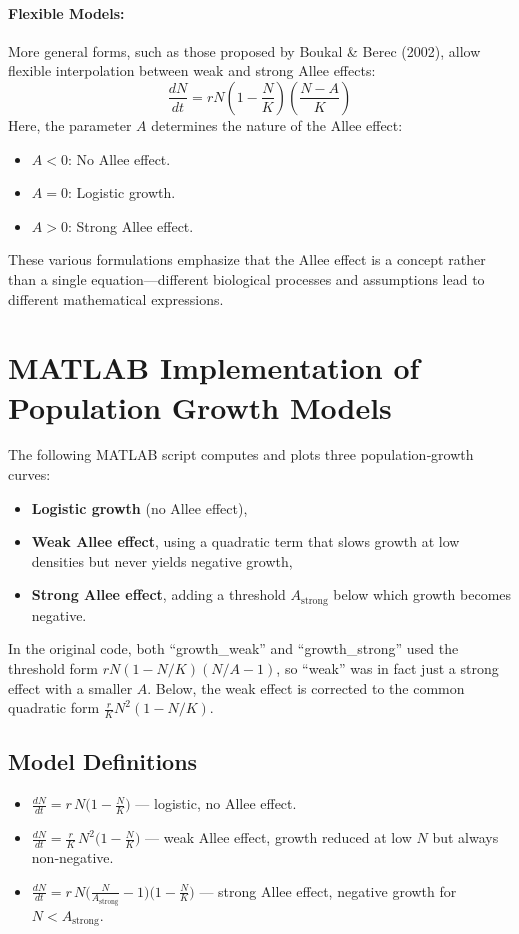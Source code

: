\documentclass{article}
\begin{document}
\paragraph{Flexible Models:}
More general forms, such as those proposed by Boukal \& Berec (2002), allow flexible interpolation between weak and strong Allee effects:
\[
\frac{dN}{dt} = rN\left(1 - \frac{N}{K} \right)\left( \frac{N - A}{K} \right)
\]
Here, the parameter $A$ determines the nature of the Allee effect:
\begin{itemize}
    \item $A < 0$: No Allee effect.
    \item $A = 0$: Logistic growth.
    \item $A > 0$: Strong Allee effect.
\end{itemize}

These various formulations emphasize that the Allee effect is a concept rather than a single equation—different biological processes and assumptions lead to different mathematical expressions.


\section{MATLAB Implementation of Population Growth Models}

The following MATLAB script computes and plots three population‐growth curves:
\begin{itemize}
  \item \textbf{Logistic growth} (no Allee effect),
  \item \textbf{Weak Allee effect}, using a quadratic term that slows growth at low densities but never yields negative growth,
  \item \textbf{Strong Allee effect}, adding a threshold \(A_\text{strong}\) below which growth becomes negative.
\end{itemize}

In the original code, both “growth\_weak” and “growth\_strong” used the threshold form 
\(\displaystyle rN(1 - N/K)(N/A - 1)\), so “weak” was in fact just a strong effect with a smaller \(A\).  
Below, the weak effect is corrected to the common quadratic form
\(\displaystyle \tfrac{r}{K}N^2(1 - N/K)\).

\subsection{Model Definitions}
\begin{itemize}
  \item \(\displaystyle\frac{dN}{dt} = r\,N\bigl(1 - \tfrac{N}{K}\bigr)\)  
        — logistic, no Allee effect.
  \item \(\displaystyle\frac{dN}{dt} = \frac{r}{K}\,N^2\bigl(1 - \tfrac{N}{K}\bigr)\)  
        — weak Allee effect, growth reduced at low \(N\) but always non‐negative.
  \item \(\displaystyle\frac{dN}{dt} = r\,N\bigl(\tfrac{N}{A_\text{strong}} - 1\bigr)\bigl(1 - \tfrac{N}{K}\bigr)\)  
        — strong Allee effect, negative growth for \(N < A_\text{strong}\).
\end{itemize}
\end{document}
